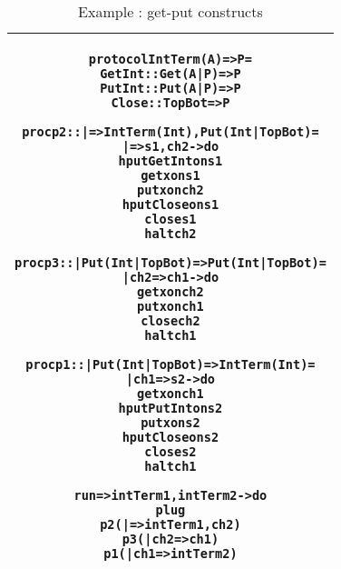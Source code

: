 \documentclass[11pt]{article}
\newcommand{\<}{\langle}
\renewcommand{\>}{\rangle}
\begin{document}
\begin{table}
\begin{center}
\begin{tabular}{|c|} \hline
\begin{minipage}{5in}
{
\begin{alltt}


    protocol IntTerm (A) => P =
        GetInt    :: Get (A|P) => P 
        PutInt    :: Put (A|P) => P
        Close     :: TopBot    => P  


    proc p2 :: |  => IntTerm (Int),Put(Int|TopBot) =
        |  => s1,ch2 -> do 
            hput GetInt on s1
            get x on s1
            put x on ch2
            hput Close on s1
            close s1 
            halt ch2


    proc p3 :: |  Put (Int|TopBot) => Put (Int|TopBot) =
        | ch2 => ch1 -> do 
           get x on ch2
           put x on ch1 
           close ch2
           halt ch1

    proc p1 :: | Put (Int|TopBot) => IntTerm (Int) = 
         | ch1 => s2 -> do 
            get x on ch1 
            hput PutInt on s2 
            put x on s2 
            hput Close on s2 
            close s2
            halt ch1

    run => intTerm1,intTerm2 -> do 
        plug
          p2 ( | => intTerm1,ch2)  
          p3 ( | ch2 => ch1) 
          p1 ( | ch1 => intTerm2 )



\end{alltt}

} 
\end {minipage} 
\tabularnewline
\hline
\end{tabular}
\caption{Example : {\sf get-put} constructs}
\label{Conc : getputExample}
\end{center}
\end{table}
\end{document}
